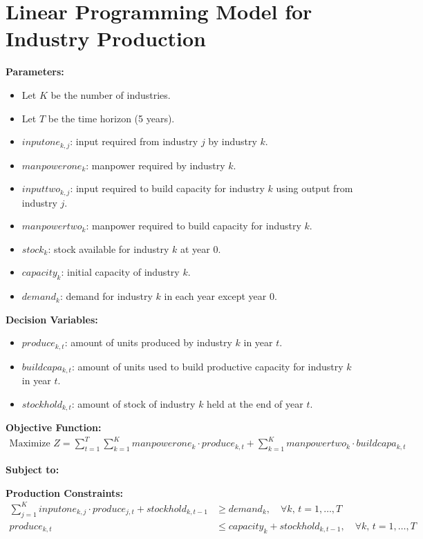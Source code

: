 \documentclass{article}
\begin{document}
\section*{Linear Programming Model for Industry Production}

\textbf{Parameters:}
\begin{itemize}
    \item Let $K$ be the number of industries.
    \item Let $T$ be the time horizon (5 years).
    \item $inputone_{k,j}$: input required from industry $j$ by industry $k$.
    \item $manpowerone_k$: manpower required by industry $k$.
    \item $inputtwo_{k,j}$: input required to build capacity for industry $k$ using output from industry $j$.
    \item $manpowertwo_k$: manpower required to build capacity for industry $k$.
    \item $stock_k$: stock available for industry $k$ at year 0.
    \item $capacity_k$: initial capacity of industry $k$.
    \item $demand_k$: demand for industry $k$ in each year except year 0.
\end{itemize}

\textbf{Decision Variables:}
\begin{itemize}
    \item $produce_{k,t}$: amount of units produced by industry $k$ in year $t$.
    \item $buildcapa_{k,t}$: amount of units used to build productive capacity for industry $k$ in year $t$.
    \item $stockhold_{k,t}$: amount of stock of industry $k$ held at the end of year $t$.
\end{itemize}

\textbf{Objective Function:}
\begin{align*}
\text{Maximize } Z = \sum_{t=1}^T \sum_{k=1}^K manpowerone_k \cdot produce_{k,t} + \sum_{k=1}^K manpowertwo_k \cdot buildcapa_{k,t}
\end{align*}

\textbf{Subject to:}

\textbf{Production Constraints:}
\begin{align*}
\sum_{j=1}^{K} inputone_{k,j} \cdot produce_{j,t} + stockhold_{k,t-1} &\geq demand_k, \quad \forall k, \, t = 1,\ldots,T \\
produce_{k,t} &\leq capacity_k + stockhold_{k,t-1}, \quad \forall k, \, t = 1,\ldots,T
\end{align*}
\end{document}
